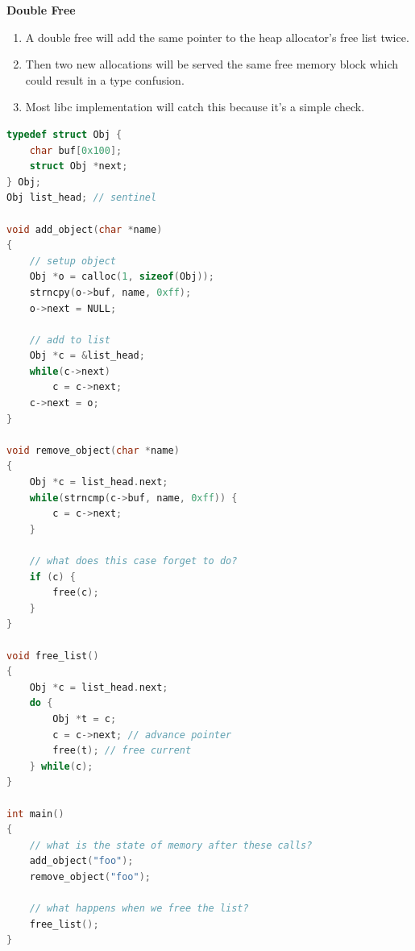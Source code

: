 \documentclass[12pt]{Training}
\begin{document}
\textbf{Double Free}
\begin{enumerate}
    \item A double free will add the same pointer to the heap allocator's free list twice.
    \item Then two new allocations will be served the same free memory block which could result in a type confusion.
    \item Most libc implementation will catch this because it's a simple check.
\end{enumerate}
\begin{sectionbox}
\begin{lstlisting}[language=C, caption={Double Free}]
typedef struct Obj {
    char buf[0x100];
    struct Obj *next;
} Obj;
Obj list_head; // sentinel

void add_object(char *name)
{
    // setup object
    Obj *o = calloc(1, sizeof(Obj));
    strncpy(o->buf, name, 0xff);
    o->next = NULL;

    // add to list
    Obj *c = &list_head;
    while(c->next)
        c = c->next;
    c->next = o;
}

void remove_object(char *name)
{
    Obj *c = list_head.next;
    while(strncmp(c->buf, name, 0xff)) {
        c = c->next;
    }

    // what does this case forget to do?
    if (c) {
        free(c);
    }
}

void free_list()
{
    Obj *c = list_head.next;
    do {
        Obj *t = c;
        c = c->next; // advance pointer
        free(t); // free current
    } while(c);
}

int main()
{
    // what is the state of memory after these calls?
    add_object("foo");
    remove_object("foo");

    // what happens when we free the list?
    free_list();
}
\end{lstlisting}
\end{sectionbox}
\end{document}
